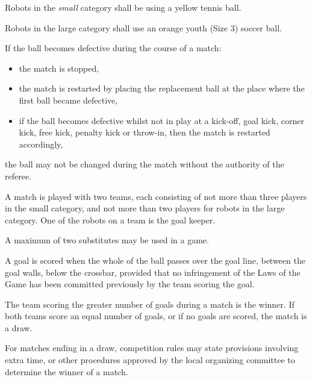 \documentclass[12pt]{hurocup}
\begin{document}
\begin{lawlist}
\item Robots in the \textit{small} category shall be using a yellow
 tennis ball.

\item Robots in the large category shall use an orange youth (Size 3)
soccer ball. 

\item If the ball becomes defective during the course of a match:
  \begin{itemize}
  \item the match is stopped,
  \item the match is restarted by placing the replacement ball at the place where the first ball became defective, 
  \item if the ball becomes defective whilst not in play at a
    kick-off, goal kick, corner kick, free kick, penalty kick or
    throw-in, then the match is restarted accordingly,
  \end{itemize}
\item the ball may not be changed during the match without the authority of the referee.

\end{lawlist}


\begin{lawlist}
\item A match is played with two teams, each consisting of not more
  than three players in the small category, and not more than two
  players for robots in the large category. One of the robots on a
  team is the goal keeper.
\item A maximum of two substitutes may be used in a game.
\end{lawlist}

\label{law:scoring}

\begin{lawlist}
  
\item A goal is scored when the whole of the ball passes over the goal
  line, between the goal walls, below the crossbar, provided that no
  infringement of the Laws of the Game has been committed previously
  by the team scoring the goal.
  
\item The team scoring the greater number of goals during a match is
  the winner. If both teams score an equal number of goals, or if no
  goals are scored, the match is a draw.
  
\item For matches ending in a draw, competition rules may state
  provisions involving extra time, or other procedures approved by the
  local organizing committee to determine the winner of a match.
\end{lawlist}
\end{document}
